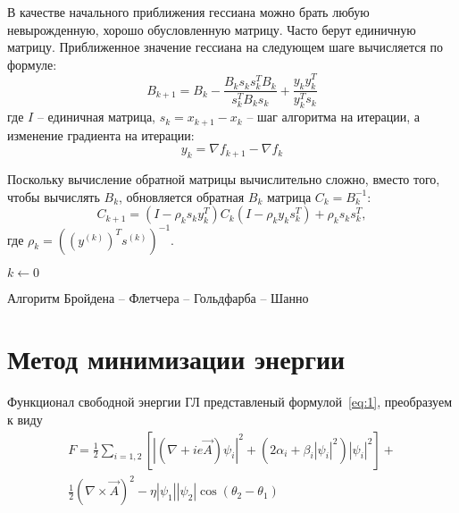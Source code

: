 В качестве начального приближения гессиана можно брать любую невырожденную, 
хорошо обусловленную матрицу. Часто берут единичную матрицу. Приближенное 
значение гессиана на следующем шаге вычисляется по формуле:
\[ 
    B_{k + 1} = B_k - \frac{B_k s_k s_k^T B_k}{s_k^T B_k s_k} + 
        \frac{y_k y_k^T}{y_k^T s_k} 
\]
где \( I \) -- единичная матрица, \( s_k = x_{k + 1} - x_k \) -- шаг алгоритма 
на итерации, а изменение градиента на итерации:
\begin{equation} 
    y_k = \nabla f_{k + 1} - \nabla f_{k} 
    \label{eq:y_k}
\end{equation}

Поскольку вычисление обратной матрицы вычислительно сложно, вместо того, 
чтобы вычислять \( B_k \), обновляется обратная \( B_k \) матрица 
\( C_k = B_k^{-1} \):
\begin{equation}
    C_{k + 1} = (I - \rho_k s_k y_k^T)C_k(I - \rho_k y_k s_k^T) + 
        \rho_k s_k s_k^T, 
    \label{eq:c_k}
\end{equation}
где \( \rho_k = ((y^{(k)})^T s^{(k)})^{-1} \).

\begin{algorithm}[H]
    \SetAlgoLined
    $k \gets 0$\;
    \caption{Алгоритм Бройдена -- Флетчера -- Гольдфарба -- Шанно 
        \cite{skajaa2010limited}}
\end{algorithm}

\section{Метод минимизации энергии}

Функционал свободной энергии ГЛ представленый формулой~\eqref{eq:1}, 
преобразуем к виду
\begin{gather}
    F = \frac{1}{2}\sum\limits_{i=1,2}\left[ 
        \left|\left( \nabla + ie\vec{A}\right)\psi_i\right|^2 + 
        \left( 2\alpha_i + \beta_i |\psi_i|^2 \right)|\psi_i|^2 \right] + 
        \nonumber \\
        \frac{1}{2}\left( \nabla\times\vec{A} \right)^2 - 
        \eta|\psi_1||\psi_2|\cos(\theta_2-\theta_1)
    \label{eqm:1}
\end{gather}

